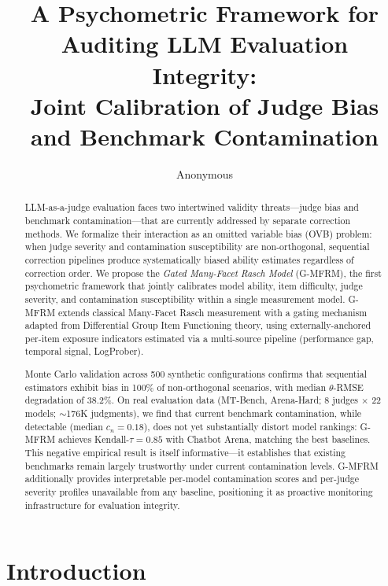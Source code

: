 \documentclass[11pt]{article}
\title{A Psychometric Framework for Auditing LLM Evaluation Integrity:\\Joint Calibration of Judge Bias and Benchmark Contamination}
\author{Anonymous}
\date{}
\newcommand{\gmfrm}{G-MFRM}
\newcommand{\cn}{c_n}
\begin{document}
\maketitle

\begin{abstract}
LLM-as-a-judge evaluation faces two intertwined validity threats---judge bias and benchmark contamination---that are currently addressed by separate correction methods. We formalize their interaction as an omitted variable bias (OVB) problem: when judge severity and contamination susceptibility are non-orthogonal, sequential correction pipelines produce systematically biased ability estimates regardless of correction order. We propose the \emph{Gated Many-Facet Rasch Model} (\gmfrm{}), the first psychometric framework that jointly calibrates model ability, item difficulty, judge severity, and contamination susceptibility within a single measurement model. \gmfrm{} extends classical Many-Facet Rasch measurement with a gating mechanism adapted from Differential Group Item Functioning theory, using externally-anchored per-item exposure indicators estimated via a multi-source pipeline (performance gap, temporal signal, LogProber).

Monte Carlo validation across 500 synthetic configurations confirms that sequential estimators exhibit bias in 100\% of non-orthogonal scenarios, with median $\theta$-RMSE degradation of 38.2\%. On real evaluation data (MT-Bench, Arena-Hard; 8 judges $\times$ 22 models; ${\sim}$176K judgments), we find that current benchmark contamination, while detectable (median $\cn = 0.18$), does not yet substantially distort model rankings: \gmfrm{} achieves Kendall-$\tau = 0.85$ with Chatbot Arena, matching the best baselines. This negative empirical result is itself informative---it establishes that existing benchmarks remain largely trustworthy under current contamination levels. \gmfrm{} additionally provides interpretable per-model contamination scores and per-judge severity profiles unavailable from any baseline, positioning it as proactive monitoring infrastructure for evaluation integrity.

\end{abstract}

\section{Introduction}
\label{sec:intro}
\end{document}
